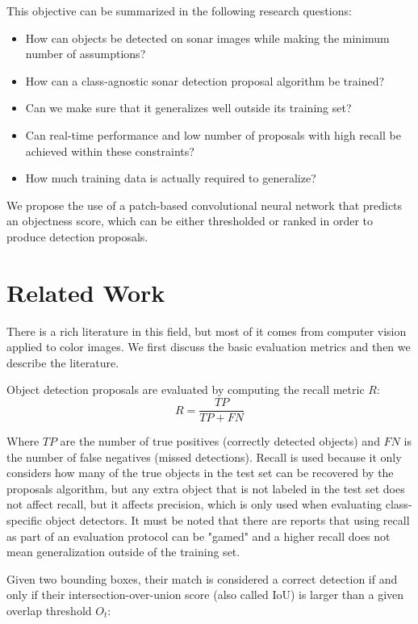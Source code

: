 This objective can be summarized in the following research questions:

\begin{itemize}
	\item How can objects be detected on sonar images while making the minimum number of assumptions?
	\item How can a class-agnostic sonar detection proposal algorithm be trained? 
	\item Can we make sure that it generalizes well outside its training set?
	\item Can real-time performance and low number of proposals with high recall be achieved within these constraints?
	\item How much training data is actually required to generalize?
\end{itemize}

We propose the use of a patch-based convolutional neural network that predicts an objectness score, which can be either thresholded or ranked in order to produce detection proposals.

\section{Related Work}

There is a rich literature in this field, but most of it comes from computer vision applied to color images. We first discuss the basic evaluation metrics and then we describe the literature.

Object detection proposals are evaluated by computing the recall metric $R$:
\vspace*{1em}
\begin{equation}
	R = \frac{TP}{TP + FN}
\end{equation}

Where $TP$ are the number of true positives (correctly detected objects) and $FN$ is the number of false negatives (missed detections). Recall is used because it only considers how many of the true objects in the test set can be recovered by the proposals algorithm, but any extra object that is not labeled in the test set does not affect recall, but it affects precision, which is only used when evaluating class-specific object detectors. It must be noted that there are reports \cite[-4em]{chavali2016object} that using recall as part of an evaluation protocol can be "gamed" and a higher recall does not mean generalization outside of the training set.

Given two bounding boxes, their match is considered a correct detection if and only if their intersection-over-union score (also called IoU) is larger than a given overlap threshold $O_t$:

